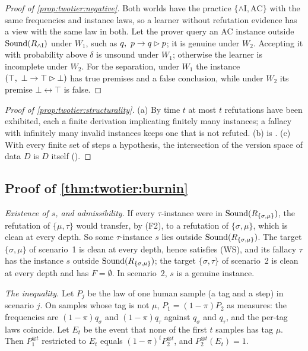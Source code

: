 \begin{proof}[Proof of \cref{prop:twotier:negative}]
Both worlds have the practice $\{\wedge\mathrm I,\mathrm{AC}\}$ with the same frequencies and instance laws, so a learner without refutation evidence has a view with the same law in both. Let the prover query an AC instance outside $\mathrm{Sound}(R_{\wedge\mathrm I})$ under $W_1$, such as $q,\ p\to q\rhd p$; it is genuine under $W_2$. Accepting it with probability above $\delta$ is unsound under $W_1$; otherwise the learner is incomplete under $W_2$. For the separation, under $W_1$ the instance $(\top,\ \bot\to\top\step\bot)$ has true premises and a false conclusion, while under $W_2$ its premise $\bot\leftrightarrow\top$ is false.
\end{proof}

\begin{proof}[Proof of \cref{prop:twotier:structurality}]
(a) By time $t$ at most $t$ refutations have been exhibited, each a finite derivation implicating finitely many instances; a fallacy with infinitely many invalid instances keeps one that is not refuted. (b) is . (c) With every finite set of steps a hypothesis, the intersection of the version space of data $D$ is $D$ itself ().
\end{proof}

\subsection{Proof of \texorpdfstring{\cref{thm:twotier:burnin}}{the rare-refuter theorem}}\label{app:twotier:burnin}

\emph{Existence of $s$, and admissibility.} If every $\tau$-instance were in $\mathrm{Sound}(R_{\{\sigma,\mu\}})$, the refutation of $\{\mu,\tau\}$ would transfer, by (F2), to a refutation of $\{\sigma,\mu\}$, which is clean at every depth. So some $\tau$-instance $s$ lies outside $\mathrm{Sound}(R_{\{\sigma,\mu\}})$. The target $\{\sigma,\mu\}$ of scenario~1 is clean at every depth, hence satisfies (WS), and its fallacy $\tau$ has the instance $s$ outside $\mathrm{Sound}(R_{\{\sigma,\mu\}})$; the target $\{\sigma,\tau\}$ of scenario~2 is clean at every depth and has $F=\emptyset$. In scenario~2, $s$ is a genuine instance.

\emph{The inequality.} Let $P_j$ be the law of one human sample (a tag and a step) in scenario $j$. On samples whose tag is not $\mu$, $P_1=(1-\pi)P_2$ as measures: the frequencies are $(1-\pi)q_\sigma$ and $(1-\pi)q_\tau$ against $q_\sigma$ and $q_\tau$, and the per-tag laws coincide. Let $E_t$ be the event that none of the first $t$ samples has tag $\mu$. Then $P_1^{\otimes t}$ restricted to $E_t$ equals $(1-\pi)^tP_2^{\otimes t}$, and $P_2^{\otimes t}(E_t)=1$.

